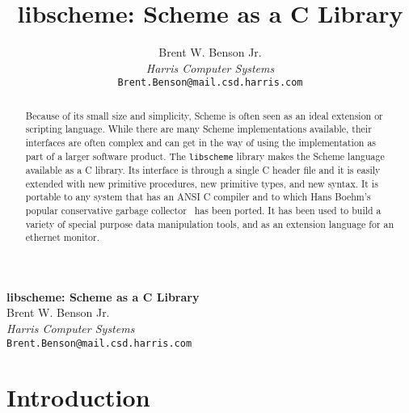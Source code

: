 
\pagestyle{empty}
\oddsidemargin 0.375in
\evensidemargin 0.375in
\textwidth 5.875in
\topmargin 0in
\textheight 9in
\headheight 0in
\footheight 0in
\headsep 0in
\footskip 0in
\flushbottom

\title{\bf libscheme: Scheme as a C Library}
\author{Brent W. Benson Jr.\\
{\em Harris Computer Systems\/}\\
\verb+Brent.Benson@mail.csd.harris.com+}
\date{}



\vspace*{0.4in}

\begin{center}
{\Large\bf libscheme: Scheme as a C Library}\\
\vspace{0.2in}
{\large Brent W. Benson Jr.}\\
{\large\em Harris Computer Systems}\\
{\large\tt Brent.Benson@mail.csd.harris.com}
\end{center}

\vspace{0.05in}

\begin{abstract}
  Because of its small size and simplicity, Scheme is often seen as an
  ideal extension or scripting language.  While there are many Scheme
  implementations available, their interfaces are often complex and
  can get in the way of using the implementation as part of a larger
  software product.  The \verb+libscheme+ library makes the Scheme
  language available as a C library.  Its interface is through a
  single C header file and it is easily extended with new primitive
  procedures, new primitive types, and new syntax.  It is portable to
  any system that has an ANSI C compiler and to which Hans Boehm's
  popular conservative garbage collector~\cite{bib:boehm} has been
  ported.  It has been used to build a variety of special purpose data
  manipulation tools, and as an extension language for an ethernet
  monitor.
\end{abstract}

\section{Introduction}


